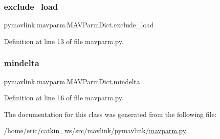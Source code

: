 \subsubsection{\texorpdfstring{exclude\_load}{exclude\_load}}
{\footnotesize\ttfamily pymavlink.\+mavparm.\+M\+A\+V\+Parm\+Dict.\+exclude\+\_\+load}



Definition at line 13 of file mavparm.\+py.

\mbox{\label{classpymavlink_1_1mavparm_1_1MAVParmDict_a4b88b42a8f98ed67c5a95dd9aa75597e}} 
\subsubsection{\texorpdfstring{mindelta}{mindelta}}
{\footnotesize\ttfamily pymavlink.\+mavparm.\+M\+A\+V\+Parm\+Dict.\+mindelta}



Definition at line 16 of file mavparm.\+py.



The documentation for this class was generated from the following file\+:\begin{DoxyCompactItemize}
\item 
/home/eric/catkin\+\_\+ws/src/mavlink/pymavlink/\mbox{\hyperlink{mavparm_8py}{mavparm.\+py}}\end{DoxyCompactItemize}
